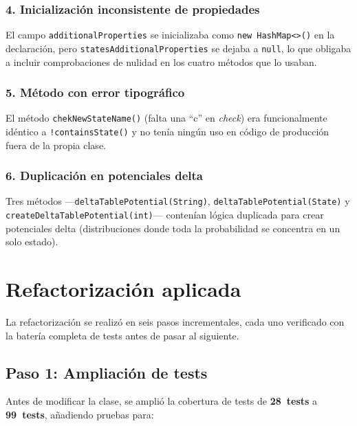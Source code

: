 \documentclass[11pt,a4paper]{article}
\newcommand{\code}[1]{\texttt{#1}}
\begin{document}
\subsubsection{4. Inicializaci\'on inconsistente de propiedades}

El campo \code{additionalProperties} se inicializaba como
\code{new HashMap<>()} en la declaraci\'on, pero
\code{statesAdditionalProperties} se dejaba a \code{null}, lo que
obligaba a incluir comprobaciones de nulidad en los cuatro m\'etodos que
lo usaban.

\subsubsection{5. M\'etodo con error tipogr\'afico}

El m\'etodo \code{chekNewStateName()} (falta una ``c'' en \emph{check})
era funcionalmente id\'entico a \code{!containsState()} y no ten\'ia
ning\'un uso en c\'odigo de producci\'on fuera de la propia clase.

\subsubsection{6. Duplicaci\'on en potenciales delta}

Tres m\'etodos ---\code{deltaTablePotential(String)},
\code{deltaTablePotential(State)} y
\code{createDeltaTablePotential(int)}--- conten\'ian l\'ogica duplicada
para crear potenciales delta (distribuciones donde toda la probabilidad
se concentra en un solo estado).

\section{Refactorizaci\'on aplicada}
\label{sec:refactorizacion}

La refactorizaci\'on se realiz\'o en seis pasos incrementales, cada uno
verificado con la bater\'ia completa de tests antes de pasar al
siguiente.

\subsection{Paso 1: Ampliaci\'on de tests}

Antes de modificar la clase, se ampli\'o la cobertura de tests de
\textbf{28~tests} a \textbf{99~tests}, a\~nadiendo pruebas para:
\end{document}
